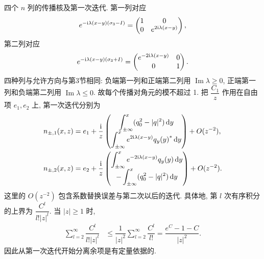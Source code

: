 \par\smallskip\noindent 四个 $n$ 列的传播核及第一次迭代.\quad
第一列对应
\begin{equation*}
e^{-\mathrm{i}\lambda(x-y)(\sigma_3-I)}
=\begin{pmatrix}1&0\\0&e^{2\mathrm{i}\lambda(x-y)}\end{pmatrix},
\end{equation*}
第二列对应
\begin{equation*}
e^{-\mathrm{i}\lambda(x-y)(\sigma_3+I)}
=\begin{pmatrix}e^{-2\mathrm{i}\lambda(x-y)}&0\\0&1\end{pmatrix}.
\end{equation*}
四种列与允许方向与第3节相同:
负端第一列和正端第二列用 $\operatorname{Im}\lambda\ge0$,
正端第一列和负端第二列用 $\operatorname{Im}\lambda\le0$.
故每个传播对角元的模不超过 1.
把 $\dfrac{ C_1}{z}$ 作用在自由项 $e_1,e_2$ 上,
第一次迭代分别为
\begin{align*}
n_{\pm,1}(x,z)
&=e_1+\dfrac{\mathrm{i}}{z}
\begin{pmatrix}
\displaystyle\int_{\pm\infty}^{x}(q_0^2-|q|^2)\,\mathrm{d} y\\[4pt]
\displaystyle\int_{\pm\infty}^{x}
 e^{2\mathrm{i}\lambda(x-y)}{q_y(y)}^{*}\,\mathrm{d} y
\end{pmatrix}+O(z^{-2}),\\
n_{\pm,2}(x,z)
&=e_2+\dfrac{\mathrm{i}}{z}
\begin{pmatrix}
\displaystyle\int_{\pm\infty}^{x}
 e^{-2\mathrm{i}\lambda(x-y)}q_y(y)\,\mathrm{d} y\\[4pt]
-\displaystyle\int_{\pm\infty}^{x}(q_0^2-|q|^2)\,\mathrm{d} y
\end{pmatrix}+O(z^{-2}).
\end{align*}
这里的 $O(z^{-2})$ 包含系数替换误差与第二次以后的迭代.
具体地, 第 $l$ 次有序积分的上界为
$\dfrac{C^l}{l!|z|^l}$.
当 $|z|\ge1$ 时,
\begin{align*}
\sum\limits_{l=2}^{\infty}\dfrac{C^l}{l!|z|^l}
&\le\dfrac{1}{|z|^2}\sum\limits_{l=2}^{\infty}\dfrac{C^l}{l!}
=\dfrac{e^C-1-C}{|z|^2}.
\end{align*}
因此从第一次迭代开始分离余项是有定量依据的.

